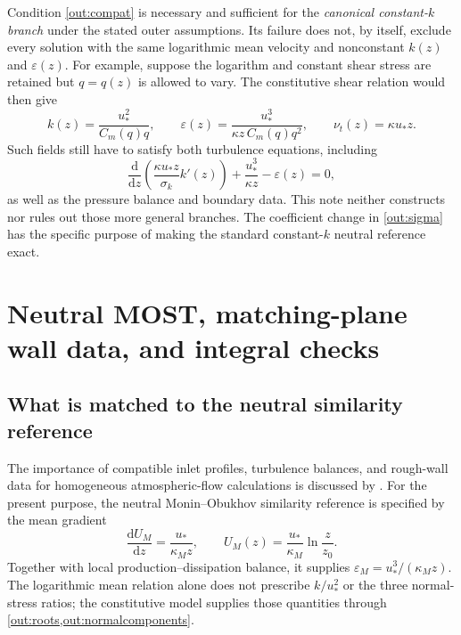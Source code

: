 \documentclass[11pt,a4paper]{article}
\numberwithin{equation}{section}
\newcommand{\eps}{\varepsilon}
\newcommand{\ust}{u_*}
\newcommand{\nut}{\nu_t}
\newcommand{\dd}{\mathrm d}
\begin{document}
Condition \cref{out:compat} is necessary and sufficient for the
\emph{canonical constant-$k$ branch} under the stated outer assumptions.
Its failure does not, by itself, exclude every solution with the same
logarithmic mean velocity and nonconstant $k(z)$ and $\eps(z)$.
For example, suppose the logarithm and constant shear stress are retained
but $q=q(z)$ is allowed to vary. The constitutive shear relation would
then give
\begin{equation}
 k(z)=\frac{\ust^2}{C_m(q)q},\qquad
 \eps(z)=\frac{\ust^3}{\kappa z\,C_m(q)q^2},\qquad
 \nut(z)=\kappa\ust z.
 \label{out:nonconstantcandidate}
\end{equation}
Such fields still have to satisfy both turbulence equations, including
\begin{equation}
 \frac{\dd}{\dd z}\left(\frac{\kappa\ust z}{\sigma_k}k'(z)\right)
 +\frac{\ust^3}{\kappa z}-\eps(z)=0,
 \label{out:nonconstantk}
\end{equation}
as well as the pressure balance and boundary data. This note neither
constructs nor rules out those more general branches. The coefficient
change in \cref{out:sigma} has the specific purpose of making the
standard constant-$k$ neutral reference exact.

\section{Neutral MOST, matching-plane wall data, and integral checks}
\label{out:wallbenchmark}

\subsection{What is matched to the neutral similarity reference}
\label{out:MOST}

The importance of compatible inlet profiles, turbulence balances,
and rough-wall data for homogeneous atmospheric-flow calculations
is discussed by \citet{RichardsHoxey1993,RichardsNorris2011,Blocken2007}.
For the present purpose, the neutral Monin--Obukhov similarity
reference is specified by the mean gradient
\begin{equation}
 \frac{\dd U_M}{\dd z}=\frac{\ust}{\kappa_M z},\qquad
 U_M(z)=\frac{\ust}{\kappa_M}\ln\frac z{z_0}.
 \label{out:MOSTreference}
\end{equation}
Together with local production--dissipation balance, it supplies
$\eps_M=\ust^3/(\kappa_Mz)$. The logarithmic mean relation alone does
not prescribe $k/\ust^2$ or the three normal-stress ratios; the
constitutive model supplies those quantities through
\cref{out:roots,out:normalcomponents}.
\end{document}
